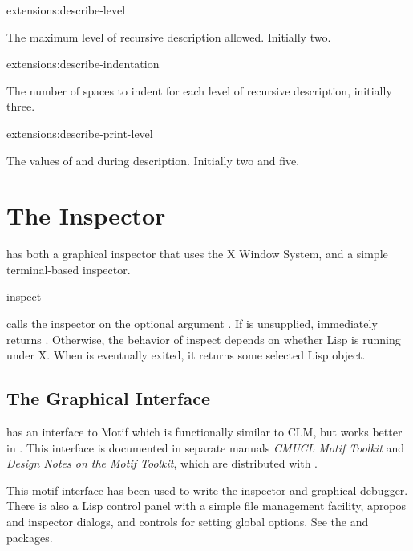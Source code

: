 \begin{defvar}{extensions:}{describe-level}

  The maximum level of recursive description allowed.  Initially two.
\end{defvar}

\begin{defvar}{extensions:}{describe-indentation}

The number of spaces to indent for each level of recursive
description, initially three.
\end{defvar}

\begin{defvar}{extensions:}{describe-print-level}
  
  The values of  and  during
  description.  Initially two and five.
\end{defvar}


\section{The Inspector}

\cmucl{} has both a graphical inspector that uses the X Window System,
and a simple terminal-based inspector.

\begin{defun}{}{inspect}{ }
  
   calls the inspector on the optional argument
  .  If  is unsupplied, 
  immediately returns \false.  Otherwise, the behavior of inspect
  depends on whether Lisp is running under X.  When  is
  eventually exited, it returns some selected Lisp object.
\end{defun}


\subsection{The Graphical Interface}
\label{motif-interface}

\cmucl{} has an interface to Motif which is functionally similar to
CLM, but works better in \cmucl{}.  This interface is documented in
separate manuals \textit{CMUCL Motif Toolkit} and \textit{Design Notes
on the Motif Toolkit}, which are distributed with \cmucl{}.

This motif interface has been used to write the inspector and graphical
debugger.  There is also a Lisp control panel with a simple file management
facility, apropos and inspector dialogs, and controls for setting global
options.  See the  and  packages.

